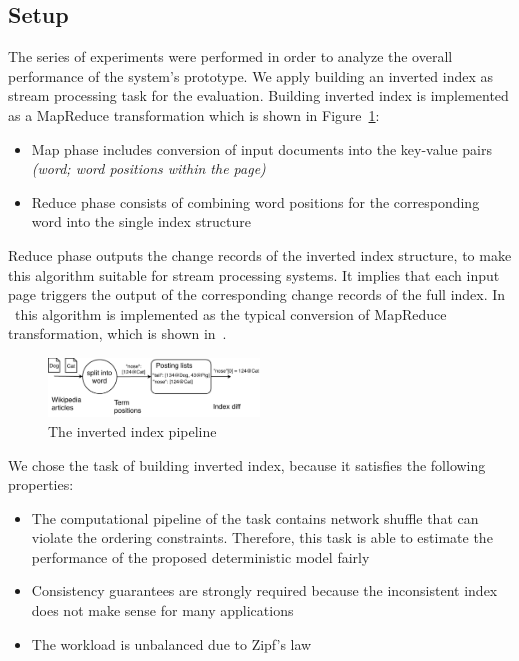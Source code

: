 
\label {fs-experiments-seciton}

\subsection{Setup}
The series of experiments were performed in order to analyze the overall performance of the system's prototype. We apply building an inverted index as stream processing task for the evaluation. Building inverted index is implemented as a MapReduce transformation which is shown in Figure~\ref{index}: 

\begin{itemize}
    \item Map phase includes conversion of input documents into the key-value pairs {\it (word; word positions within the page)}
    \item Reduce phase consists of combining word positions for the corresponding word into the single index structure 
\end{itemize}

Reduce phase outputs the change records of the inverted index structure, to make this algorithm suitable for stream processing systems. It implies that each input page triggers the output of the corresponding change records of the full index. In \FlameStream\ this algorithm is implemented as the typical conversion of MapReduce transformation, which is shown in~\cite{hiddenSeim}.

\begin{figure}[htbp]
  \centering
  \includegraphics[width=0.50\textwidth]{pics/index}
  \caption{The inverted index pipeline}
  \label {index}
\end{figure}

We chose the task of building inverted index, because it satisfies the following properties:

\begin{itemize}
    \item The computational pipeline of the task contains network shuffle that can violate the ordering constraints. Therefore, this task is able to estimate the performance of the proposed deterministic model fairly
    \item Consistency guarantees are strongly required because the inconsistent index does not make sense for many applications
    \item The workload is unbalanced due to Zipf's law
\end{itemize}


